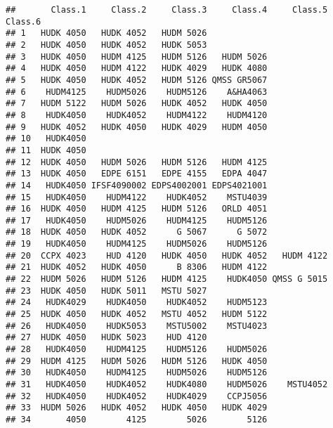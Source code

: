 \documentclass[]{article}
\begin{document}
\begin{verbatim}
##       Class.1     Class.2     Class.3     Class.4     Class.5   Class.6
## 1   HUDK 4050   HUDK 4052   HUDM 5026                                  
## 2   HUDK 4050   HUDK 4052   HUDK 5053                                  
## 3   HUDK 4050   HUDM 4125   HUDM 5126   HUDM 5026                      
## 4   HUDK 4050   HUDM 4122   HUDK 4029   HUDK 4080                      
## 5   HUDK 4050   HUDK 4052   HUDM 5126 QMSS GR5067                      
## 6    HUDM4125    HUDM5026    HUDM5126    A&HA4063                      
## 7   HUDM 5122   HUDM 5026   HUDK 4052   HUDK 4050                      
## 8    HUDK4050    HUDK4052    HUDM4122    HUDM4120                      
## 9   HUDK 4052   HUDK 4050   HUDK 4029   HUDM 4050                      
## 10   HUDK4050                                                          
## 11  HUDK 4050                                                          
## 12  HUDK 4050   HUDM 5026   HUDM 5126   HUDM 4125                      
## 13  HUDK 4050   EDPE 6151   EDPE 4155   EDPA 4047                      
## 14   HUDK4050 IFSF4090002 EDPS4002001 EDPS4021001                      
## 15   HUDK4050    HUDM4122    HUDK4052    MSTU4039                      
## 16  HUDK 4050   HUDM 4125   HUDM 5126   ORLD 4051                      
## 17   HUDK4050    HUDM5026    HUDM4125    HUDM5126                      
## 18  HUDK 4050   HUDK 4052      G 5067      G 5072                      
## 19   HUDK4050    HUDM4125    HUDM5026    HUDM5126                      
## 20  CCPX 4023    HUD 4120   HUDK 4050   HUDK 4052   HUDM 4122          
## 21  HUDK 4052   HUDK 4050      B 8306   HUDM 4122                      
## 22  HUDM 5026   HUDM 5126   HUDM 4125    HUDK4050 QMSS G 5015          
## 23  HUDK 4050   HUDK 5011   MSTU 5027                                  
## 24   HUDK4029    HUDK4050    HUDK4052    HUDM5123                      
## 25  HUDK 4050   HUDK 4052   MSTU 4052   HUDM 5122                      
## 26   HUDK4050    HUDK5053    MSTU5002    MSTU4023                      
## 27  HUDK 4050   HUDK 5023    HUD 4120                                  
## 28   HUDK4050    HUDM4125    HUDM5126    HUDM5026                      
## 29  HUDM 4125   HUDM 5026   HUDM 5126   HUDK 4050                      
## 30   HUDK4050    HUDM4125    HUDM5026    HUDM5126                      
## 31   HUDK4050    HUDK4052    HUDK4080    HUDM5026    MSTU4052          
## 32   HUDK4050    HUDK4052    HUDK4029    CCPJ5056                      
## 33  HUDM 5026   HUDK 4052   HUDK 4050   HUDK 4029                      
## 34       4050        4125        5026        5126                      

\end{verbatim}
\end{document}
